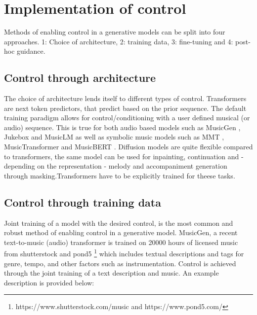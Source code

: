 \section{Implementation of control} \label{section:addingcontrol}
Methods of enabling control in a generative models can be split into four approaches. 1: Choice of architecture, 2: training data, 3: fine-tuning and 4: post-hoc guidance.

\subsection{Control through architecture}
The choice of architecture lends itself to different types of control. Transformers are next token predictors, that predict based on the prior sequence. The default training paradigm allows for control/conditioning with a user defined musical (or audio) sequence. This is true for both audio based models such as MusicGen \cite{copet2023simple}, Jukebox \cite{Dhariwal_Jun_Payne_Kim_Radford_Sutskever_2020} and MusicLM \cite{Agostinelli_Denk_Borsos_Engel_Verzetti_Caillon_Huang_Jansen_Roberts_Tagliasacchi_et_al._2023} as well as symbolic music models such as MMT \cite{Dong_Chen_MMT_Kirkpatrick_2023}, MusicTransformer \cite{Huang_Vaswani_Uszkoreit_Shazeer_Simon_Hawthorne_Dai_Hoffman_Dinculescu_Eck_2018} and MusicBERT \cite{Zeng_Tan_Wang_MUSICBERT_2021}. Diffusion models are quite flexible compared to transformers, the same model can be used for inpainting, continuation and - depending on the representation - melody and accompaniment generation through masking.\cite{Min_Jiang_Xia_Zhao_polyffusion_2023}\cite{Rombach_Blattmann_Lorenz_Esser_Ommer_2022}Transformers have to be explicitly trained for theese tasks. 

\subsection{Control through training data}
Joint training of a model with the desired control, is the most common and robust method of enabling control in a generative model. MusicGen\cite{copet2023simple}, a recent text-to-music (audio) transformer is trained on 20000 hours of licensed music from shutterstock and pond5 \footnote{https://www.shutterstock.com/music and https://www.pond5.com/} which includes textual descriptions and tags for genre, tempo, and other factors such as instrumentation. Control is achieved through the joint training of a text description and music. An example description is provided below: 

